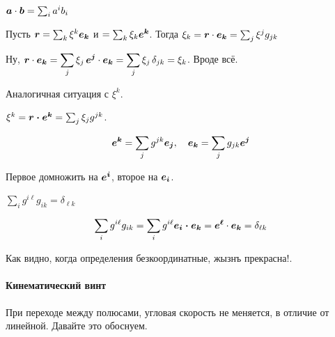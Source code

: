 \documentclass[timbord]{longnotes}
\begin{document}
\begin{prop}
  $\v a\cdot \v b = \sum_i a^i b_i$
\end{prop}

\begin{prop}
  Пусть $\v r = \sum_k \xi^k \v {e_k}$ и $=\sum_k\xi_k \v{e^k}$.
  Тогда $\xi_k = \v r \cdot \v{e_k} = \sum_j \xi^j g_{jk}$
\end{prop}
\begin{lproof}
  Ну, $\v{r} \cdot \v{e_k} = \dsum_j \xi_j \, \v{e^j}\cdot \v{e_k} 
  = \sum_j \xi_j \,\delta_{jk} = \xi_k$. Вроде всё.
\end{lproof}

Аналогичная ситуация с $\xi^k$.
\begin{prop}
  $\xi^k = \v{r\cdot e^k} = \sum_j \xi_j g^{jk}$.
\end{prop}

\begin{prop}
\[
  \v{e^k} = \sum_j g^{jk} \v{e_j}, \quad \v{e_k} = \sum_j g_{jk} \v{e^j}
\]
\begin{lproof}
  Первое домножить на $\v{e^i}$, второе на $\v{e_i}$.
\end{lproof}
\end{prop}
\begin{prop}
  $\sum_{i} g^{i\ell}g_{ik} = \delta_{\ell k}$
\end{prop}
\begin{lproof}
  \[
    \sum_{i} g^{i\ell}g_{ik} = \sum_i g^{i\ell} \v{e_i \cdot e_k} = \v{e^\ell}\cdot \v{e_k} =
    \delta_{\ell k}
  \]  
\end{lproof}


Как видно, когда определения безкоординатные, жызнъ прекрасна!. 
\setcounter{paragraph}{12}
\paragraph{Кинематический винт}

При переходе между полюсами, угловая скорость не меняется, в отличие от линейной.
Давайте это обоснуем.
\end{document}
